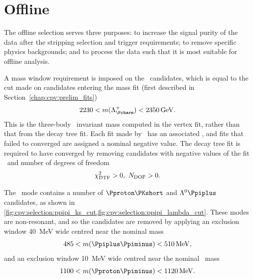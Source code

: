 \begin{table}[bp]
  \centering
  \caption{%
    Selection of tracks, with associated particle hypotheses, used in the 
    \PLambdab\ and \PLambdac\ stripping selection.
    Cuts listed under ``All'' are applied to all tracks.
  }
  \label{tab:cpv:selection:stripping_basic}
  
\end{table}

\begin{table}
  \centering
  \caption{%
    Stripping selection of particle combinations, vertices, and events.
  }
  \label{tab:cpv:selection:stripping_composite}
  
\end{table}

\section{Offline}
\label{chap:cpv:selection:offline}

The offline selection serves three purposes: to increase the signal purity of 
the data after the stripping selection and trigger requirements; to remove 
specific physics backgrounds; and to process the data such that it is most 
suitable for offline analysis.

A mass window requirement is imposed on the \PLambdac\ candidates, which is 
equal to the cut made on candidates entering the mass fit (first described in 
Section~\ref{chap:cpv:prelim_fits})
\begin{equation}
  2230 < m(\PLambdac) < \SI{2350}{\GeV}.
  \label{eqn:cpv:selection:mass_window}
\end{equation}
This is the three-body \phh\ invariant mass computed in the vertex fit, rather 
than that from the decay tree fit.
Each fit made by \decaytreefitter\ has an associated \chisq, and fits that 
failed to converged are assigned a nominal negative value.
The decay tree fit is required to have converged by removing candidates with 
negative values of the fit \chisq\ and number of degrees of freedom
\begin{equation}
  \chi^2_{\text{DTF}} > 0,\ N_{\text{DOF}} > 0.
  \label{eqn:selection:dtf_convergence}
\end{equation}

The \ppipi\ mode contains a number of $\Pproton\PKshort$ and $\PLambda\Ppiplus$ 
candidates, as shown in 
\cref{fig:cpv:selection:ppipi_ks_cut,fig:cpv:selection:ppipi_lambda_cut}.
These modes are non-resonant, and so the candidates are removed by applying an 
exclusion window \SI{40}{\MeV} wide centred near the nominal \PKshort 
mass~\cite{PDG2014}
\begin{equation}
  485 < m(\Ppiplus\Ppiminus) < \SI{510}{\MeV},
\end{equation}
and an exclusion window \SI{10}{\MeV} wide centred near the nominal \PLambda\ 
mass~\cite{PDG2014}
\begin{equation}
  1100 < m(\Pproton\Ppiminus) < \SI{1120}{\MeV}.
\end{equation}

